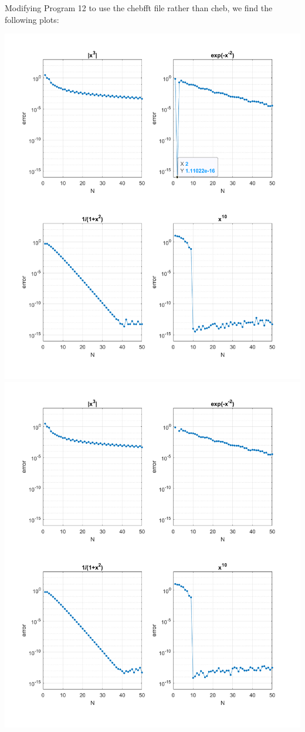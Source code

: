 \documentclass{article}
\begin{document}
Modifying Program 12 to use the chebfft file rather than cheb, we find the following plots:
\begin{center}
    \includegraphics[scale = 0.25]{ChebyshevDiffMat}
    \includegraphics[scale = 0.25]{ChebFFT}
\end{center}
\end{document}
